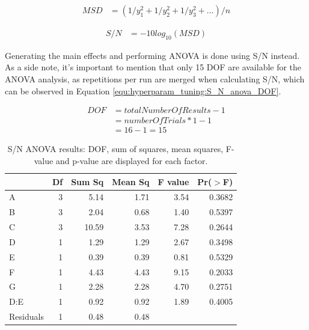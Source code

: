 \begin{equation}
	\begin{split}
		MSD & = (1/y^2_1 + 1/y^2_2 + 1/y^2_3 + ... ) / n
	\end{split}
	 \label{equ:hyperparam_tuning:MSD}
\end{equation}

\begin{equation}
	\begin{split}
		S/N & = -10 log_{10} (MSD)
	\end{split}
	 \label{equ:hyperparam_tuning:S_N}
\end{equation}

Generating the main effects and performing ANOVA is done using S/N instead. As a side note, it's important to mention that only 15 DOF are available for the ANOVA analysis, as repetitions per run are merged when calculating S/N, which can be observed in Equation \ref{equ:hyperparam_tuning:S_N_anova_DOF}.

\begin{equation}
	\begin{split}
		DOF & = totalNumberOfResults - 1 \\
		& = numberOfTrials * 1 - 1 \\
		& = 16 - 1 = 15
	\end{split}
	 \label{equ:hyperparam_tuning:S_N_anova_DOF}
\end{equation}

\begin{table}[ht]
	\centering
	\begin{tabular}{lrrrrr}
		\hline
		& Df & Sum Sq & Mean Sq & F value & Pr($>$F) \\ 
		\hline
		A & 3 & 5.14 & 1.71 & 3.54 & 0.3682 \\ 
		B & 3 & 2.04 & 0.68 & 1.40 & 0.5397 \\ 
		C & 3 & 10.59 & 3.53 & 7.28 & 0.2644 \\ 
		D & 1 & 1.29 & 1.29 & 2.67 & 0.3498 \\ 
		E & 1 & 0.39 & 0.39 & 0.81 & 0.5329 \\ 
		F & 1 & 4.43 & 4.43 & 9.15 & 0.2033 \\ 
		G & 1 & 2.28 & 2.28 & 4.70 & 0.2751 \\ 
		D:E & 1 & 0.92 & 0.92 & 1.89 & 0.4005 \\ 
		Residuals & 1 & 0.48 & 0.48 &  &  \\ 
		\hline
	\end{tabular}
	\caption{S/N ANOVA results: DOF, sum of squares, mean squares, F-value and p-value are displayed for each factor.}
	\label{tab:hyperparameter_tuning:s_n_anova_results}
\end{table}

